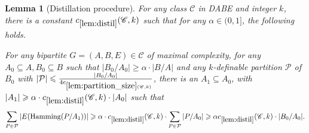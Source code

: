 \documentclass[11pt]{article}
\newtheorem{lemma}[theorem]{Lemma}
\theoremstyle{definition}
\newcommand{\CC}{{\mathscr C}}
\newcommand{\inducedSS}[2]{#1/#2}%
\renewcommand{\geq}{\geqslant}
\renewcommand{\ge}{\geqslant}
\newcommand{\Pp}{\mathcal{P}}
\newcommand{\hamming}{\mathrm{Hamming}}
\begin{document}
\begin{lemma}[Distillation procedure]\label{lem:distil}
For any class $\CC$ in DABE and integer $k$, there is a constant
$c_{\ref{lem:distil}}(\CC, k)$ such that for any $\alpha \in (0, 1]$, the following holds.

For any bipartite $G = (A, B, E) \in \CC$ of maximal complexity,
for any $A_0 \subseteq A, B_0 \subseteq B$ such that $|\inducedSS{B_0}{A_0}| \geqslant \alpha \cdot |\inducedSS{B}{A}|$
and any $k$-definable partition $\Pp$ of $B_0$ with $|\Pp| \leqslant \frac{|\inducedSS{B_0}{A_0}|}{4 c_{\ref{lem:partition_size}(\CC, k)}}$,
there is an $A_1 \subseteq A_0$, with $|A_1| \geq \alpha \cdot c_{\ref{lem:distil}}(\CC, k) \cdot |A_0|$ such that  
\[
\sum_{P \in \Pp} |E(\hamming(\inducedSS{P}{A_1}))| \ge
\alpha \cdot c_{\ref{lem:distil}}(\CC, k) \cdot \sum_{P \in \Pp} |\inducedSS{P}{A_0}| \ge \alpha c_{\ref{lem:distil}}(\CC, k) \cdot |B_0/A_0|.
\]
\end{lemma}
\end{document}
